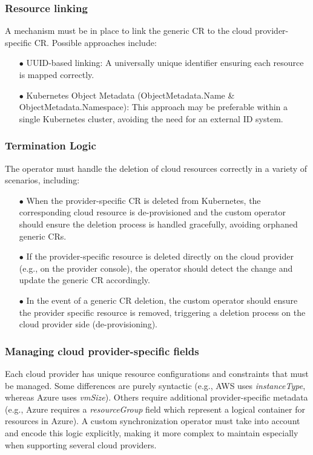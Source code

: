 \subsubsection{Resource linking}

A mechanism must be in place to link the generic CR to the cloud provider-specific CR. Possible approaches include:
\begin{itemize}[itemsep=0.2pt, topsep=1pt]
  \item[$\bullet$] UUID-based linking: A universally unique identifier ensuring each resource is mapped correctly.
  \item[$\bullet$] Kubernetes Object Metadata (ObjectMetadata.Name \& ObjectMetadata.Namespace): This approach may be preferable within a single Kubernetes cluster, avoiding the need for an external ID system.
\end{itemize}

\subsubsection{Termination Logic}

The operator must handle the deletion of cloud resources correctly in a variety of scenarios, including:
\begin{itemize}[itemsep=0.2pt, topsep=1pt]
  \item[$\bullet$] When the provider-specific CR is deleted from Kubernetes, the corresponding cloud resource is de-provisioned and the custom operator should ensure the deletion process is handled gracefully, avoiding orphaned generic CRs.
  \item[$\bullet$] If the provider-specific resource is deleted directly on the cloud provider (e.g., on the provider console), the operator should detect the change and update the generic CR accordingly.
  \item[$\bullet$] In the event of a generic CR deletion, the custom operator should ensure the provider specific resource is removed, triggering a deletion process on the cloud provider side (de-provisioning).
\end{itemize}

\subsubsection{Managing cloud provider-specific fields}

Each cloud provider has unique resource configurations and constraints that must be managed.
Some differences are purely syntactic (e.g., AWS uses \textit{instanceType}, whereas Azure uses \textit{vmSize}).
Others require additional provider-specific metadata (e.g., Azure requires a \textit{resourceGroup} field which represent a logical container for resources in Azure).
A custom synchronization operator must take into account and encode this logic explicitly, making it more complex to maintain especially when supporting several cloud providers.

